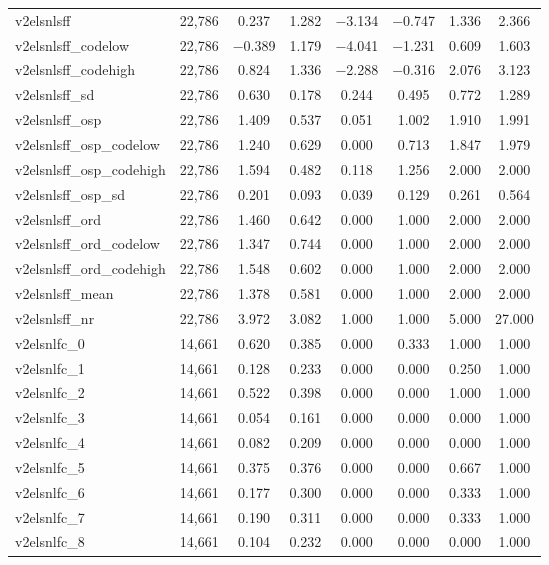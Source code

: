 \begin{table}[!htbp]
\begin{tabular}{@{\extracolsep{5pt}}lccccccc}
v2elsnlsff & 22,786 & 0.237 & 1.282 & $-$3.134 & $-$0.747 & 1.336 & 2.366 \\ 
v2elsnlsff\_codelow & 22,786 & $-$0.389 & 1.179 & $-$4.041 & $-$1.231 & 0.609 & 1.603 \\ 
v2elsnlsff\_codehigh & 22,786 & 0.824 & 1.336 & $-$2.288 & $-$0.316 & 2.076 & 3.123 \\ 
v2elsnlsff\_sd & 22,786 & 0.630 & 0.178 & 0.244 & 0.495 & 0.772 & 1.289 \\ 
v2elsnlsff\_osp & 22,786 & 1.409 & 0.537 & 0.051 & 1.002 & 1.910 & 1.991 \\ 
v2elsnlsff\_osp\_codelow & 22,786 & 1.240 & 0.629 & 0.000 & 0.713 & 1.847 & 1.979 \\ 
v2elsnlsff\_osp\_codehigh & 22,786 & 1.594 & 0.482 & 0.118 & 1.256 & 2.000 & 2.000 \\ 
v2elsnlsff\_osp\_sd & 22,786 & 0.201 & 0.093 & 0.039 & 0.129 & 0.261 & 0.564 \\ 
v2elsnlsff\_ord & 22,786 & 1.460 & 0.642 & 0.000 & 1.000 & 2.000 & 2.000 \\ 
v2elsnlsff\_ord\_codelow & 22,786 & 1.347 & 0.744 & 0.000 & 1.000 & 2.000 & 2.000 \\ 
v2elsnlsff\_ord\_codehigh & 22,786 & 1.548 & 0.602 & 0.000 & 1.000 & 2.000 & 2.000 \\ 
v2elsnlsff\_mean & 22,786 & 1.378 & 0.581 & 0.000 & 1.000 & 2.000 & 2.000 \\ 
v2elsnlsff\_nr & 22,786 & 3.972 & 3.082 & 1.000 & 1.000 & 5.000 & 27.000 \\ 
v2elsnlfc\_0 & 14,661 & 0.620 & 0.385 & 0.000 & 0.333 & 1.000 & 1.000 \\ 
v2elsnlfc\_1 & 14,661 & 0.128 & 0.233 & 0.000 & 0.000 & 0.250 & 1.000 \\ 
v2elsnlfc\_2 & 14,661 & 0.522 & 0.398 & 0.000 & 0.000 & 1.000 & 1.000 \\ 
v2elsnlfc\_3 & 14,661 & 0.054 & 0.161 & 0.000 & 0.000 & 0.000 & 1.000 \\ 
v2elsnlfc\_4 & 14,661 & 0.082 & 0.209 & 0.000 & 0.000 & 0.000 & 1.000 \\ 
v2elsnlfc\_5 & 14,661 & 0.375 & 0.376 & 0.000 & 0.000 & 0.667 & 1.000 \\ 
v2elsnlfc\_6 & 14,661 & 0.177 & 0.300 & 0.000 & 0.000 & 0.333 & 1.000 \\ 
v2elsnlfc\_7 & 14,661 & 0.190 & 0.311 & 0.000 & 0.000 & 0.333 & 1.000 \\ 
v2elsnlfc\_8 & 14,661 & 0.104 & 0.232 & 0.000 & 0.000 & 0.000 & 1.000 \\ 

\end{tabular}
\end{table}
